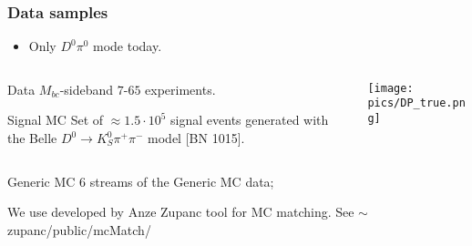 \documentclass[10 pt,compress,mathserif]{beamer}
\newcommand{\dkspp}{\ensuremath{D^0\to K_S^0\pi^+\pi^-}\xspace}
\begin{document}
\begin{frame}[containsverbatim]
\frametitle{Data samples}
 \begin{itemize}
  \item Only $D^0\pi^0$ mode today.
 \end{itemize}

 \begin{columns}
 \begin{column}{0.7\textwidth}
 \begin{block}{Data $M_{bc}$-sideband}
  $7$-$65$ experiments.
 \end{block}
 \begin{block}{Signal MC}
   Set of $\approx 1.5\cdot 10^5$ signal events generated with the Belle $\dkspp$ model [BN 1015].
  \end{block}
 \end{column}
 \begin{column}{0.3\textwidth}
  \texttt{[image: pics/DP\_true.png]}
 \end{column}
\end{columns} 
  
  \begin{block}{Generic MC}
   6 streams of the Generic MC data;
  \end{block}
  
  We use developed by Anze Zupanc tool \verb@geninfo@ for MC matching. See $\sim$zupanc/public/mcMatch/
\end{frame}
\end{document}
